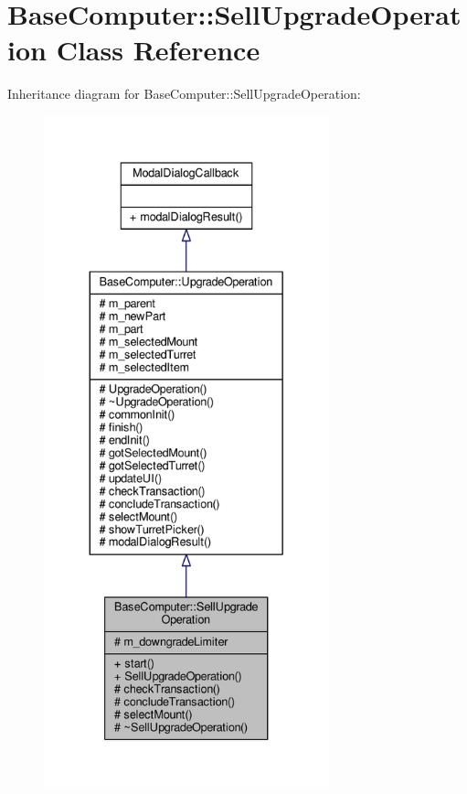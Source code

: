 \hypertarget{classBaseComputer_1_1SellUpgradeOperation}{}\section{Base\+Computer\+:\+:Sell\+Upgrade\+Operation Class Reference}
\label{classBaseComputer_1_1SellUpgradeOperation}


Inheritance diagram for Base\+Computer\+:\+:Sell\+Upgrade\+Operation\+:
\nopagebreak
\begin{figure}[H]
\begin{center}
\leavevmode
\includegraphics[height=550pt]{d0/de6/classBaseComputer_1_1SellUpgradeOperation__inherit__graph}
\end{center}
\end{figure}



